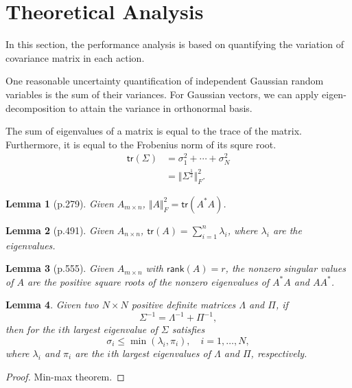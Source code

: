 \documentclass[xcolor=x11names]{article}
\newtheorem{lemma}{Lemma}
\begin{document}
\section{Theoretical Analysis}

   In this section, the performance analysis is based on quantifying the variation of covariance matrix in each action.

   One reasonable uncertainty quantification of independent Gaussian random variables is the sum of their variances. For Gaussian vectors, we can apply eigen-decomposition to attain the variance in orthonormal basis.
   
   The sum of eigenvalues of a matrix is equal to the trace of the matrix. Furthermore, it is equal to the Frobenius norm of its squre root.
   \begin{align*}
      \mathsf{tr}(\Sigma)&= \sigma_1^2 + \cdots + \sigma_N^2 \\
       &=  \Vert \Sigma^{\frac{1}{2}} \Vert^2_F.
   \end{align*}

   \begin{lemma}[p.279]
      Given $A_{m\times n}$, $\Vert A \Vert^2_F = \mathsf{tr}(A^*A)$.
   \end{lemma}

   \begin{lemma}[p.491]
      Given $A_{n\times n}$, $\mathsf{tr}(A)=\sum_{i=1}^n \lambda_i$, where $\lambda_i$ are the eigenvalues.
   \end{lemma}
   
   \begin{lemma}[p.555]
      Given $A_{m\times n}$ with $\mathsf{rank}(A)=r$, the nonzero singular values of $A$ are the positive square roots of the nonzero eigenvalues of $A^*A$ and $AA^*$.
   \end{lemma}




   \begin{lemma}
   Given two $N\times N$ positive definite matrices $\Lambda$ and $\Pi$, if 
   \begin{equation}
      \Sigma^{-1} = \Lambda^{-1} + \Pi^{-1},
      \label{eq:inverse_sum}
   \end{equation}
   then for the $i$th largest eigenvalue of $\Sigma$ satisfies
   \begin{equation}
      \sigma_i \leq  \min(\lambda_i, \pi_i),\quad i = 1,\dots, N,
   \end{equation}
   where $\lambda_i$ and $\pi_i$ are the $i$th largest eigenvalues of $\Lambda$ and $\Pi$, respectively.
   \end{lemma}
   \begin{proof}
       Min-max theorem.
   \end{proof}
   
\end{document}
